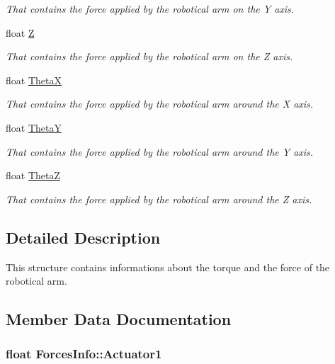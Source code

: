 \begin{DoxyCompactItemize}
\begin{DoxyCompactList}\small\item\em That contains the force applied by the robotical arm on the Y axis. \end{DoxyCompactList}\item 
float \hyperlink{struct_forces_info_a271af36e068276a370351c1ebe8ce911}{Z}
\begin{DoxyCompactList}\small\item\em That contains the force applied by the robotical arm on the Z axis. \end{DoxyCompactList}\item 
float \hyperlink{struct_forces_info_aafb194d559f4df6f76bb07194adb246c}{ThetaX}
\begin{DoxyCompactList}\small\item\em That contains the force applied by the robotical arm around the X axis. \end{DoxyCompactList}\item 
float \hyperlink{struct_forces_info_a4a2161c051b9d21e3403d387f437aba8}{ThetaY}
\begin{DoxyCompactList}\small\item\em That contains the force applied by the robotical arm around the Y axis. \end{DoxyCompactList}\item 
float \hyperlink{struct_forces_info_aabc71dcad8ea42fc58399c9cbde56fd0}{ThetaZ}
\begin{DoxyCompactList}\small\item\em That contains the force applied by the robotical arm around the Z axis. \end{DoxyCompactList}\end{DoxyCompactItemize}


\subsection{Detailed Description}
This structure contains informations about the torque and the force of the robotical arm. 

\subsection{Member Data Documentation}
\subsubsection[{\texorpdfstring{Actuator1}{Actuator1}}]{\setlength{\rightskip}{0pt plus 5cm}float Forces\+Info\+::\+Actuator1}\hypertarget{struct_forces_info_ab707b88bce0351a0baf4c71e6f3ef1c5}{}\label{struct_forces_info_ab707b88bce0351a0baf4c71e6f3ef1c5}


